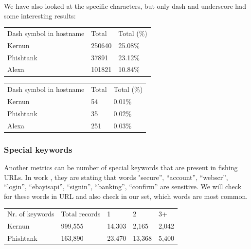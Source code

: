 \documentclass[
  digital, %
  oneside, %
  table,   %
  nolof,     %
  nolot,     %
]{fithesis3}
\begin{document}
We have also looked  at the specific characters, but only dash and underscore had some interesting results:

\begin{table}[h!]
\begin{tabular}{lll}
\multicolumn{1}{c}{Dash symbol in hostname} & Total  & Total (\%) \\
Kernun                                      & 250640 & 25.08\%    \\
Phishtank                                   & 37891  & 23.12\%    \\
Alexa                                       & 101821 & 10.84\%   
\end{tabular}
\end{table}

\begin{table}[h!]
\begin{tabular}{lll}
\multicolumn{1}{c}{Dash symbol in hostname} & Total & Total (\%) \\
Kernun                                      & 54    & 0.01\%     \\
Phishtank                                   & 35    & 0.02\%     \\
Alexa                                       & 251   & 0.03\%    
\end{tabular}
\end{table}



\subsubsection{Special keywords}

Another metrics can be number of special keywords that are present in fishing URLs. In work \cite{cantina+}, they are stating that words "secure”, “account”, “webscr”, “login”, “ebayisapi”, “signin”, “banking”, “confirm” are sensitive. We will check for these words in URL and also check in our set, which words are most common.

\begin{table}[h!]
\begin{tabular}{lllll}
\multicolumn{1}{c}{Nr. of keywords} & Total records & 1      & 2      & 3+    \\
Kernun                              & 999,555       & 14,303 & 2,165  & 2,042 \\
Phishtank                           & 163,890       & 23,470 & 13,368 & 5,400
\end{tabular}
\end{table}
\end{document}
